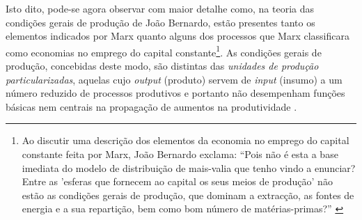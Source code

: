 Isto dito, pode-se agora observar com maior detalhe como, na teoria das condições gerais de produção de João Bernardo, estão presentes tanto os elementos indicados por Marx quanto alguns dos processos que Marx classificara como economias no emprego do capital constante\footnote{Ao discutir uma descrição dos elementos da economia no emprego do capital constante feita por Marx, João Bernardo exclama: ``Pois não é esta a base imediata do modelo de distribuição de mais-valia que tenho vindo a enunciar? Entre as 'esferas que fornecem ao capital os seus meios de produção' não estão as condições gerais de produção, que dominam a extracção, as fontes de energia e a sua repartição, bem como bom número de matérias-primas?'' \cite[p.~114]{BERNARDO1977b}}. As condições gerais de produção, concebidas deste modo, são distintas das \textit{unidades de produção particularizadas}, aquelas cujo \textit{output} (produto) servem de \textit{input} (insumo) a um número reduzido de processos produtivos e portanto não desempenham funções básicas nem centrais na propagação de aumentos na produtividade \cite[p.~158]{BERNARDO1991}.

